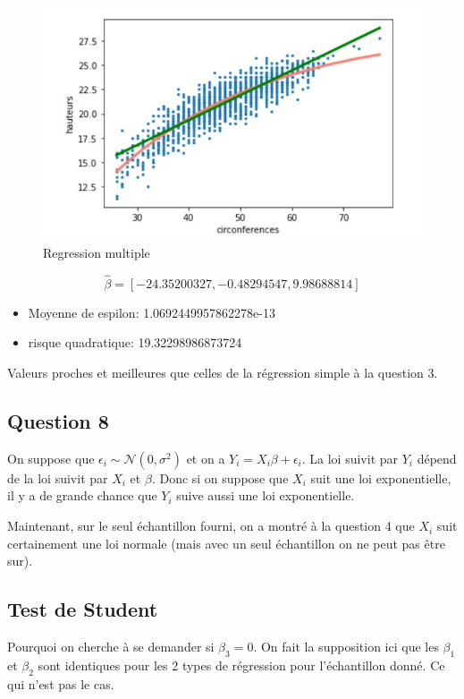 \documentclass[pdflatex]{article}
\theoremstyle{definition}
\begin{document}
\begin{figure}
	\includegraphics[scale=1]{regression_multiple.jpg}
    \caption{Regression multiple}
    \label{fig:Regression multiple}
\end{figure}

$$\hat{\beta} = [-24.35200327,  -0.48294547,   9.98688814]$$
\begin{itemize}
    \item Moyenne de espilon: 1.0692449957862278e-13
    \item risque quadratique: 19.32298986873724
\end{itemize}
Valeurs proches et meilleures que celles de la r\'egression simple \`a la question 3.


\subsection*{Question 8}
On suppose que $\epsilon_i \sim \mathscr{N}(0,\sigma^2)$ et on a $Y_i = X_i\beta + \epsilon_i$. La loi suivit par $Y_i$ d\'epend de la loi suivit par $X_i$ et $\beta$. Donc si on suppose que $X_i$ suit une loi exponentielle, il y a de grande chance que $Y_i$ suive aussi une loi exponentielle.

Maintenant, sur le seul \'echantillon fourni, on a montr\'e \`a la question 4 que $X_i$ suit certainement une loi normale (mais avec un seul \'echantillon on ne peut pas \^etre sur).


\subsection*{Test de Student}
Pourquoi on cherche \`a se demander si $\beta_3 = 0$. On fait la supposition ici que les $\beta_1$ et $\beta_2$ sont identiques pour les 2 types de r\'egression pour l'\'echantillon donn\'e. Ce qui n'est pas le cas.
\end{document}
